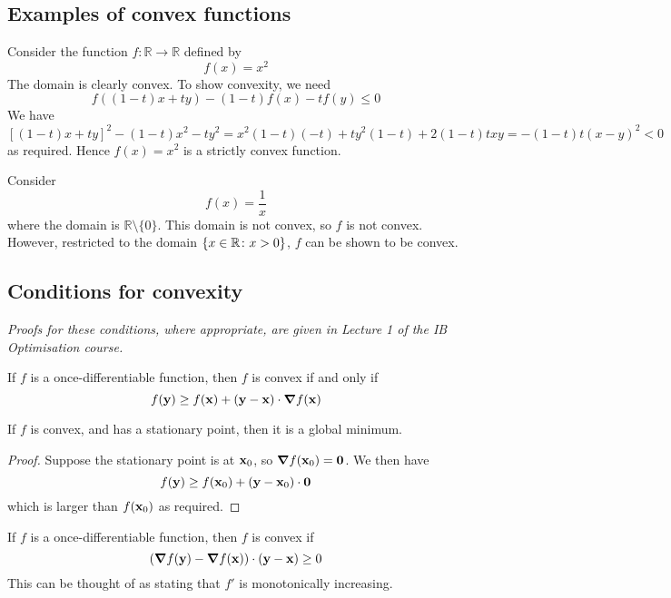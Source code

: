 \subsection{Examples of convex functions}
\begin{example}
	Consider the function \( f \colon \mathbb R \to \mathbb R \) defined by
	\[
		f(x) = x^2
	\]
	The domain is clearly convex.
	To show convexity, we need
	\[
		f((1-t)x+ty) - (1-t)f(x) - tf(y) \leq 0
	\]
	We have
	\[
		[(1-t)x+ty]^2 - (1-t)x^2 - ty^2 = x^2(1-t)(-t) + ty^2(1-t) + 2(1-t)txy = -(1-t)t(x-y)^2 < 0
	\]
	as required.
	Hence \( f(x) = x^2 \) is a strictly convex function.
\end{example}
\begin{example}
	Consider
	\[
		f(x) = \frac{1}{x}
	\]
	where the domain is \( \mathbb R \setminus \{ 0 \} \).
	This domain is not convex, so \( f \) is not convex.
	However, restricted to the domain \( \qty{ x \in \mathbb R \colon x > 0 } \), \( f \) can be shown to be convex.
\end{example}

\subsection{Conditions for convexity}
\textit{Proofs for these conditions, where appropriate, are given in Lecture 1 of the IB Optimisation course.}
\begin{theorem}
	If \( f \) is a once-differentiable function, then \( f \) is convex if and only if
	\[
		f(\vb y) \geq f(\vb x) + (\vb y - \vb x) \cdot \grad{f}(\vb x)
	\]
\end{theorem}
\begin{corollary}
	If \( f \) is convex, and has a stationary point, then it is a global minimum.
\end{corollary}
\begin{proof}
	Suppose the stationary point is at \( \vb x_0 \), so \( \grad{f}(\vb x_0) = \vb 0 \).
	We then have
	\[
		f(\vb y) \geq f(\vb x_0) + (\vb y - \vb x_0) \cdot \vb 0
	\]
	which is larger than \( f(\vb x_0) \) as required.
\end{proof}

\begin{theorem}
	If \( f \) is a once-differentiable function, then \( f \) is convex if
	\[
		(\grad{f(\vb y)} - \grad {f(\vb x)}) \cdot (\vb y - \vb x) \geq 0
	\]
	This can be thought of as stating that \( f' \) is monotonically increasing.
\end{theorem}


